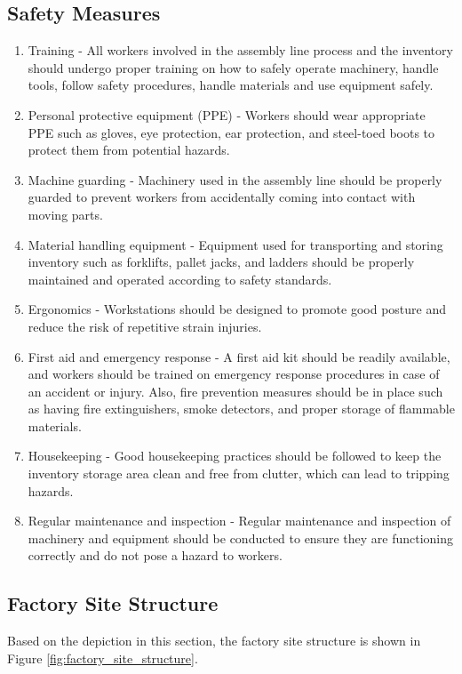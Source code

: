 \subsection{Safety Measures}
\begin{enumerate}
    \item Training - All workers involved in the assembly line process and the inventory should undergo proper training on how to safely operate machinery, handle tools, follow safety procedures, handle materials and use equipment safely.
    \item Personal protective equipment (PPE) - Workers should wear appropriate PPE such as gloves, eye protection, ear protection, and steel-toed boots to protect them from potential hazards.
    \item Machine guarding - Machinery used in the assembly line should be properly guarded to prevent workers from accidentally coming into contact with moving parts.
    \item Material handling equipment - Equipment used for transporting and storing inventory such as forklifts, pallet jacks, and ladders should be properly maintained and operated according to safety standards.
    \item Ergonomics - Workstations should be designed to promote good posture and reduce the risk of repetitive strain injuries.
    \item First aid and emergency response - A first aid kit should be readily available, and workers should be trained on emergency response procedures in case of an accident or injury. Also, fire prevention measures should be in place such as having fire extinguishers, smoke detectors, and proper storage of flammable materials.
    \item Housekeeping - Good housekeeping practices should be followed to keep the inventory storage area clean and free from clutter, which can lead to tripping hazards.
    \item Regular maintenance and inspection - Regular maintenance and inspection of machinery and equipment should be conducted to ensure they are functioning correctly and do not pose a hazard to workers.
\end{enumerate}

\subsection{Factory Site Structure}
Based on the depiction in this section, the factory site structure is shown in Figure \ref{fig:factory_site_structure}.

